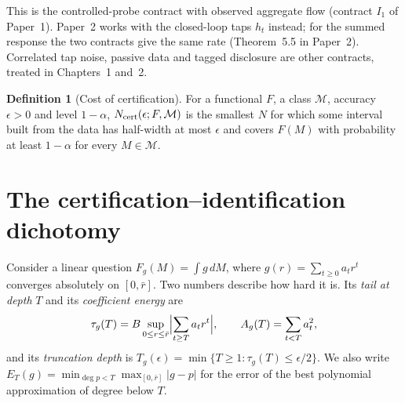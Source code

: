 \documentclass[11pt]{article}
\theoremstyle{definition}
\newtheorem{definition}[theorem]{Definition}
\theoremstyle{remark}
\begin{document}
This is the controlled-probe contract with observed aggregate flow (contract $I_1$ of Paper~1). Paper~2 works with the closed-loop taps $h_t$ instead; for the summed response the two contracts give the same rate (Theorem~\textup{5.5 in Paper~2}). Correlated tap noise, passive data and tagged disclosure are other contracts, treated in Chapters~1 and~2.

\begin{definition}[Cost of certification]\label{def:ncert}
For a functional $F$, a class $\mathcal M$, accuracy $\epsilon>0$ and level $1-\alpha$, $N_{\rm cert}(\epsilon;F,\mathcal M)$ is the smallest $N$ for which some interval built from the data has half-width at most $\epsilon$ and covers $F(M)$ with probability at least $1-\alpha$ for every $M\in\mathcal M$.
\end{definition}

\section{The certification--identification dichotomy}\label{sec:fw_dich}

Consider a linear question $F_g(M)=\int g\,dM$, where $g(r)=\sum_{t\ge0}a_t r^t$ converges absolutely on $[0,\bar r]$. Two numbers describe how hard it is. Its \emph{tail at depth} $T$ and its \emph{coefficient energy} are
\[
\tau_g(T)=B\sup_{0\le r\le\bar r}\Bigl|\sum_{t\ge T}a_t r^t\Bigr|,\qquad A_g(T)=\sum_{t<T}a_t^2,
\]
and its \emph{truncation depth} is $T_g(\epsilon)=\min\{T\ge1:\tau_g(T)\le\epsilon/2\}$. We also write $E_T(g)=\min_{\deg p<T}\max_{[0,\bar r]}|g-p|$ for the error of the best polynomial approximation of degree below $T$.
\end{document}
